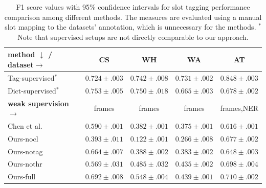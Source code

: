 \begin{table}[tp]
        \centering
        \small
        \begin{tabular}{l|c|c|c|c}
        \hline
         \textbf{method} $\downarrow$ / \textbf{dataset}$ \rightarrow$ &  \textbf{CS} & \textbf{WH} & \textbf{WA} & \textbf{AT} \\
         \hline
        Tag-supervised$^\ast$ & $0.724 \pm .003 $ & $\pmb{0.742} \pm .008$ & $\pmb{0.731} \pm .002$ & $\pmb{0.848} \pm .003$ \\
         Dict-supervised$^\ast$ & $\pmb{0.753} \pm .005 $ & $\pmb{0.750} \pm .018$ & $0.665 \pm .003$ & $0.678 \pm .002$ \\\hline
        \bf weak supervision $\rightarrow$ & frames & frames & frames &  frames,NER \\\hline
         Chen et al. & $0.590 \pm .001 $ & $0.382 \pm .001$ & $0.375 \pm .001$ & $0.616 \pm .001$  \\\hdashline[0.5pt/2pt]
         Ours-nocl & $0.393 \pm .011 $ & $0.122 \pm .001$ & $0.266 \pm .008 $ & $ 0.677 \pm .002$ \\
         Ours-notag & $0.664 \pm .007$ & $0.388 \pm .002$ & $0.383 \pm .002$ & $ 0.648 \pm .003$ \\
         Ours-nothr & $0.569 \pm .031$ & $0.485 \pm .032$ & $0.435 \pm .002 $ & $0.698 \pm .004$\\
         Ours-full & $\pmb{0.692} \pm .008$ & $\pmb{0.548} \pm .004$ & $\pmb{0.439} \pm .001$ & $\pmb{0.710} \pm .002$ \\
         \hline
        \end{tabular}
                 
        \caption{F1 score values with 95\% confidence intervals for slot tagging performance comparison among different methods. The measures are evaluated using a manual slot mapping to the datasets' annotation, which is unnecessary for the methods. $^\ast$Note that supervised setups are not directly comparable to our approach.
        \label{table:slotfilling}
        }
\end{table}

